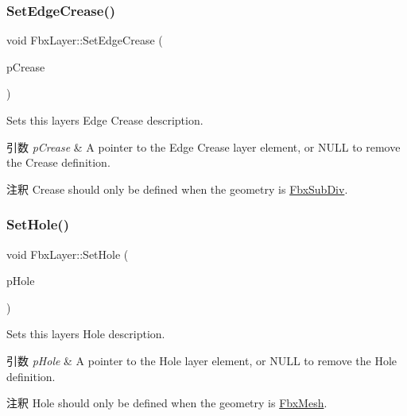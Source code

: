 \subsubsection{\texorpdfstring{Set\+Edge\+Crease()}{SetEdgeCrease()}}
{\footnotesize\ttfamily void Fbx\+Layer\+::\+Set\+Edge\+Crease (\begin{DoxyParamCaption}\item[{\hyperlink{class_fbx_layer_element_crease}{Fbx\+Layer\+Element\+Crease} $\ast$}]{p\+Crease }\end{DoxyParamCaption})}

Sets this layer\textquotesingle{}s Edge Crease description. 
\begin{DoxyParams}{引数}
{\em p\+Crease} & A pointer to the Edge Crease layer element, or {\ttfamily N\+U\+LL} to remove the Crease definition. \\
\hline
\end{DoxyParams}
\begin{DoxyRemark}{注釈}
Crease should only be defined when the geometry is \hyperlink{class_fbx_sub_div}{Fbx\+Sub\+Div}. 
\end{DoxyRemark}
\mbox{\label{class_fbx_layer_a16ce520e59a557fc056a2ca5a58f2de6}} 
\subsubsection{\texorpdfstring{Set\+Hole()}{SetHole()}}
{\footnotesize\ttfamily void Fbx\+Layer\+::\+Set\+Hole (\begin{DoxyParamCaption}\item[{\hyperlink{class_fbx_layer_element_hole}{Fbx\+Layer\+Element\+Hole} $\ast$}]{p\+Hole }\end{DoxyParamCaption})}

Sets this layer\textquotesingle{}s Hole description. 
\begin{DoxyParams}{引数}
{\em p\+Hole} & A pointer to the Hole layer element, or {\ttfamily N\+U\+LL} to remove the Hole definition. \\
\hline
\end{DoxyParams}
\begin{DoxyRemark}{注釈}
Hole should only be defined when the geometry is \hyperlink{class_fbx_mesh}{Fbx\+Mesh}. 
\end{DoxyRemark}
\mbox{\label{class_fbx_layer_a8a26e04b7f1e6f60e3f008a81b0ab6a0}} 
